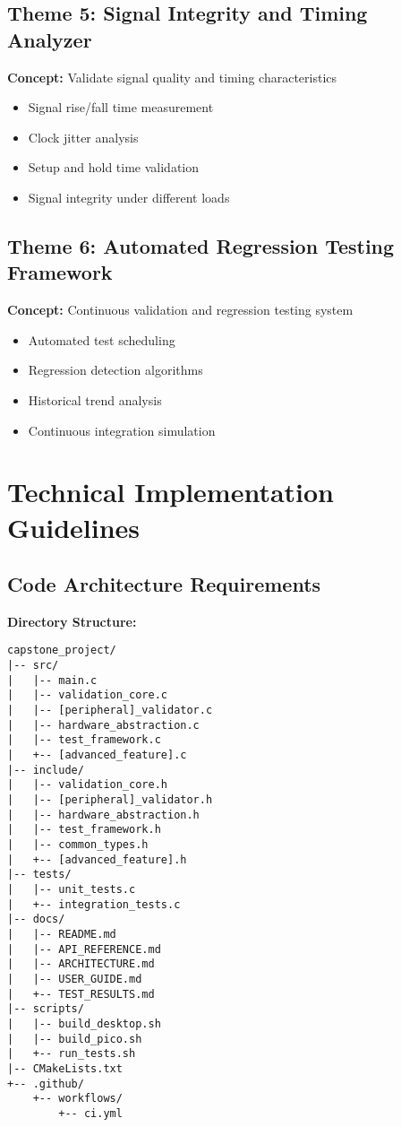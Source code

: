 \documentclass[11pt,a4paper]{article}
\begin{document}
\subsection{Theme 5: Signal Integrity and Timing Analyzer}
\textbf{Concept:} Validate signal quality and timing characteristics
\begin{itemize}
    \item Signal rise/fall time measurement
    \item Clock jitter analysis
    \item Setup and hold time validation
    \item Signal integrity under different loads
\end{itemize}

\subsection{Theme 6: Automated Regression Testing Framework}
\textbf{Concept:} Continuous validation and regression testing system
\begin{itemize}
    \item Automated test scheduling
    \item Regression detection algorithms
    \item Historical trend analysis
    \item Continuous integration simulation
\end{itemize}

\section{Technical Implementation Guidelines}

\subsection{Code Architecture Requirements}

\textbf{Directory Structure:}
\begin{verbatim}
capstone_project/
|-- src/
|   |-- main.c
|   |-- validation_core.c
|   |-- [peripheral]_validator.c
|   |-- hardware_abstraction.c
|   |-- test_framework.c
|   +-- [advanced_feature].c
|-- include/
|   |-- validation_core.h
|   |-- [peripheral]_validator.h
|   |-- hardware_abstraction.h
|   |-- test_framework.h
|   |-- common_types.h
|   +-- [advanced_feature].h
|-- tests/
|   |-- unit_tests.c
|   +-- integration_tests.c
|-- docs/
|   |-- README.md
|   |-- API_REFERENCE.md
|   |-- ARCHITECTURE.md
|   |-- USER_GUIDE.md
|   +-- TEST_RESULTS.md
|-- scripts/
|   |-- build_desktop.sh
|   |-- build_pico.sh
|   +-- run_tests.sh
|-- CMakeLists.txt
+-- .github/
    +-- workflows/
        +-- ci.yml
\end{verbatim}
\end{document}
